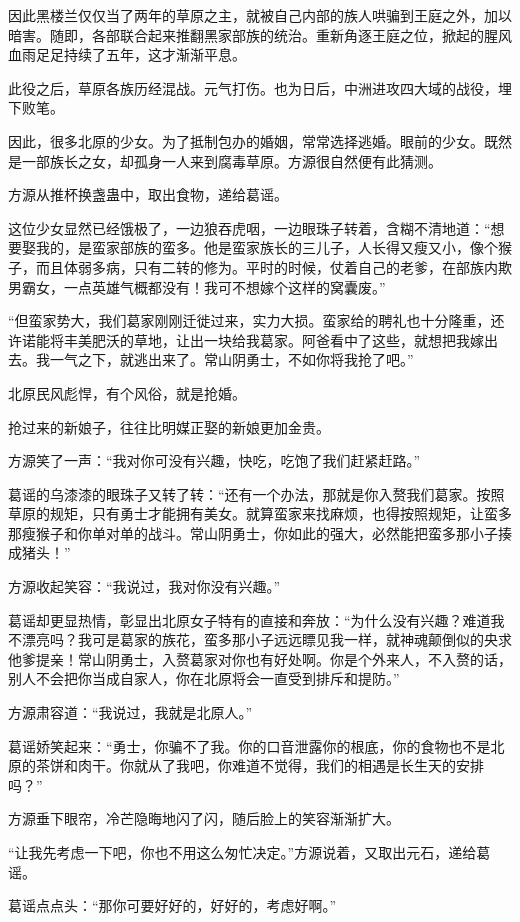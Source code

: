 \begin{this_body}
因此黑楼兰仅仅当了两年的草原之主，就被自己内部的族人哄骗到王庭之外，加以暗害。随即，各部联合起来推翻黑家部族的统治。重新角逐王庭之位，掀起的腥风血雨足足持续了五年，这才渐渐平息。

此役之后，草原各族历经混战。元气打伤。也为日后，中洲进攻四大域的战役，埋下败笔。

因此，很多北原的少女。为了抵制包办的婚姻，常常选择逃婚。眼前的少女。既然是一部族长之女，却孤身一人来到腐毒草原。方源很自然便有此猜测。

方源从推杯换盏蛊中，取出食物，递给葛谣。

这位少女显然已经饿极了，一边狼吞虎咽，一边眼珠子转着，含糊不清地道：“想要娶我的，是蛮家部族的蛮多。他是蛮家族长的三儿子，人长得又瘦又小，像个猴子，而且体弱多病，只有二转的修为。平时的时候，仗着自己的老爹，在部族内欺男霸女，一点英雄气概都没有！我可不想嫁个这样的窝囊废。”

“但蛮家势大，我们葛家刚刚迁徙过来，实力大损。蛮家给的聘礼也十分隆重，还许诺能将丰美肥沃的草地，让出一块给我葛家。阿爸看中了这些，就想把我嫁出去。我一气之下，就逃出来了。常山阴勇士，不如你将我抢了吧。”

北原民风彪悍，有个风俗，就是抢婚。

抢过来的新娘子，往往比明媒正娶的新娘更加金贵。

方源笑了一声：“我对你可没有兴趣，快吃，吃饱了我们赶紧赶路。”

葛谣的乌漆漆的眼珠子又转了转：“还有一个办法，那就是你入赘我们葛家。按照草原的规矩，只有勇士才能拥有美女。就算蛮家来找麻烦，也得按照规矩，让蛮多那瘦猴子和你单对单的战斗。常山阴勇士，你如此的强大，必然能把蛮多那小子揍成猪头！”

方源收起笑容：“我说过，我对你没有兴趣。”

葛谣却更显热情，彰显出北原女子特有的直接和奔放：“为什么没有兴趣？难道我不漂亮吗？我可是葛家的族花，蛮多那小子远远瞟见我一样，就神魂颠倒似的央求他爹提亲！常山阴勇士，入赘葛家对你也有好处啊。你是个外来人，不入赘的话，别人不会把你当成自家人，你在北原将会一直受到排斥和提防。”

方源肃容道：“我说过，我就是北原人。”

葛谣娇笑起来：“勇士，你骗不了我。你的口音泄露你的根底，你的食物也不是北原的茶饼和肉干。你就从了我吧，你难道不觉得，我们的相遇是长生天的安排吗？”

方源垂下眼帘，冷芒隐晦地闪了闪，随后脸上的笑容渐渐扩大。

“让我先考虑一下吧，你也不用这么匆忙决定。”方源说着，又取出元石，递给葛谣。

葛谣点点头：“那你可要好好的，好好的，考虑好啊。”


\end{this_body}
